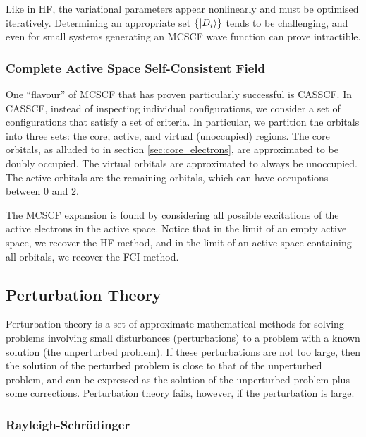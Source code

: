 Like in HF, the variational parameters appear nonlinearly and must be optimised iteratively. Determining an appropriate set $\{\ket{D_i}\}$ tends to be challenging, and even for small systems generating an MCSCF wave function can prove intractible.

\subsubsection{Complete Active Space Self-Consistent Field}
One ``flavour'' of \gls{MCSCF} that has proven particularly successful is \gls{CASSCF}.\cite{olsenCASSCF2011,roosComplete1980,siegbahnComparison1980,siegbahnComplete1981} In CASSCF, instead of inspecting individual configurations, we consider a set of configurations that satisfy a set of criteria. In particular, we partition the orbitals into three sets: the core, active, and virtual (unoccupied) regions. The core orbitals, as alluded to in section \ref{sec:core_electrons}, are approximated to be doubly occupied. The virtual orbitals are approximated to always be unoccupied. The active orbitals are the remaining orbitals, which can have occupations between 0 and 2.

The MCSCF expansion is found by considering all possible excitations of the active electrons in the active space. Notice that in the limit of an empty active space, we recover the \gls{HF} method, and in the limit of an active space containing all orbitals, we recover the \gls{FCI} method.


\subsection{Perturbation Theory}
\label{sec:perturbation-theory}

Perturbation theory is a set of approximate mathematical methods for solving problems involving small disturbances (perturbations) to a problem with a known solution (the unperturbed problem). If these perturbations are not too large, then the solution of the perturbed problem is close to that of the unperturbed problem, and can be expressed as the solution of the unperturbed problem plus some corrections. Perturbation theory fails, however, if the perturbation is large.

\subsubsection{Rayleigh-Schr\"odinger}

